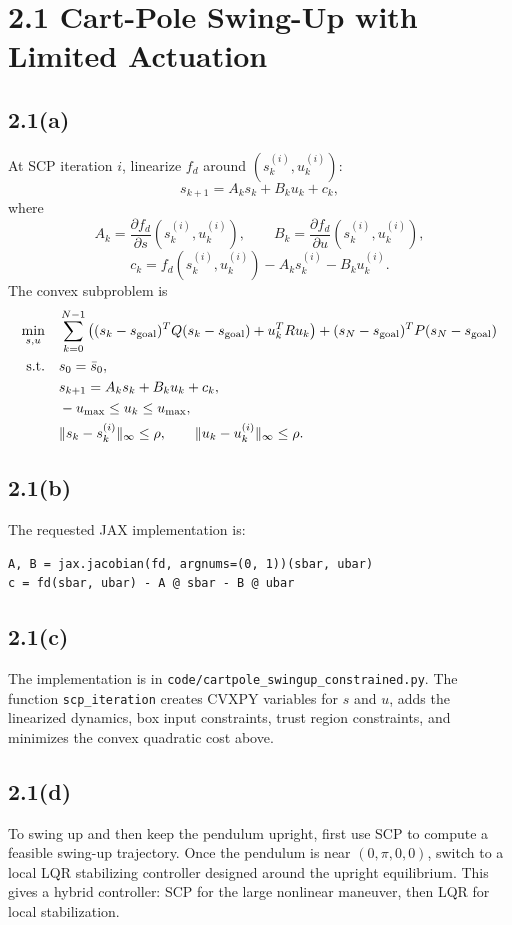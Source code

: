 \documentclass[11pt]{article}
\begin{document}
\section*{2.1 Cart-Pole Swing-Up with Limited Actuation}

\subsection*{2.1(a)}
At SCP iteration \(i\), linearize \(f_d\) around
\((s_k^{(i)},u_k^{(i)})\):
\[
    s_{k+1}=A_k s_k+B_k u_k+c_k,
\]
where
\[
    A_k=\frac{\partial f_d}{\partial s}(s_k^{(i)},u_k^{(i)}),\qquad
    B_k=\frac{\partial f_d}{\partial u}(s_k^{(i)},u_k^{(i)}),
\]
\[
    c_k=f_d(s_k^{(i)},u_k^{(i)})-A_k s_k^{(i)}-B_k u_k^{(i)}.
\]
The convex subproblem is
\[
\begin{aligned}
\min_{s,u}\quad
&\sum_{k=0}^{N-1}\left((s_k-s_{\rm goal})^TQ(s_k-s_{\rm goal})+u_k^TRu_k\right)
 +(s_N-s_{\rm goal})^TP(s_N-s_{\rm goal})\\
\text{s.t.}\quad
&s_0=\bar s_0,\\
&s_{k+1}=A_k s_k+B_k u_k+c_k,\\
&-u_{\max}\le u_k\le u_{\max},\\
&\|s_k-s_k^{(i)}\|_\infty\le \rho,\qquad
  \|u_k-u_k^{(i)}\|_\infty\le \rho.
\end{aligned}
\]

\subsection*{2.1(b)}
The requested JAX implementation is:
\begin{lstlisting}
A, B = jax.jacobian(fd, argnums=(0, 1))(sbar, ubar)
c = fd(sbar, ubar) - A @ sbar - B @ ubar
\end{lstlisting}

\subsection*{2.1(c)}
The implementation is in \texttt{code/cartpole\_swingup\_constrained.py}. The
function \texttt{scp\_iteration} creates CVXPY variables for \(s\) and \(u\),
adds the linearized dynamics, box input constraints, trust region constraints,
and minimizes the convex quadratic cost above.

\subsection*{2.1(d)}
To swing up and then keep the pendulum upright, first use SCP to compute a
feasible swing-up trajectory. Once the pendulum is near
\((0,\pi,0,0)\), switch to a local LQR stabilizing controller designed around
the upright equilibrium. This gives a hybrid controller: SCP for the large
nonlinear maneuver, then LQR for local stabilization.
\end{document}
